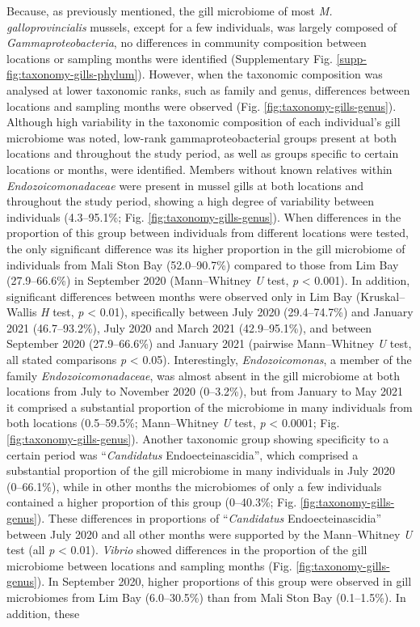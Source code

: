 \documentclass[
  12 pt,
]{article}
\begin{document}
Because, as previously mentioned, the gill microbiome of most \emph{M. galloprovincialis} mussels, except for a few individuals, was largely composed of \emph{Gammaproteobacteria}, no differences in community composition between locations or sampling months were identified (Supplementary Fig. \ref{supp-fig:taxonomy-gills-phylum}). However, when the taxonomic composition was analysed at lower taxonomic ranks, such as family and genus, differences between locations and sampling months were observed (Fig. \ref{fig:taxonomy-gills-genus}). Although high variability in the taxonomic composition of each individual's gill microbiome was noted, low-rank gammaproteobacterial groups present at both locations and throughout the study period, as well as groups specific to certain locations or months, were identified. Members without known relatives within \emph{Endozoicomonadaceae} were present in mussel gills at both locations and throughout the study period, showing a high degree of variability between individuals (4.3--95.1\unit{\percent}; Fig. \ref{fig:taxonomy-gills-genus}). When differences in the proportion of this group between individuals from different locations were tested, the only significant difference was its higher proportion in the gill microbiome of individuals from Mali Ston Bay (52.0--90.7\unit{\percent}) compared to those from Lim Bay (27.9--66.6\unit{\percent}) in September 2020 (Mann--Whitney \emph{U} test, \emph{p} \textless{} 0.001). In addition, significant differences between months were observed only in Lim Bay (Kruskal--Wallis \emph{H} test, \emph{p} \textless{} 0.01), specifically between July 2020 (29.4--74.7\unit{\percent}) and January 2021 (46.7--93.2\unit{\percent}), July 2020 and March 2021 (42.9--95.1\unit{\percent}), and between September 2020 (27.9--66.6\unit{\percent}) and January 2021 (pairwise Mann--Whitney \emph{U} test, all stated comparisons \emph{p} \textless{} 0.05). Interestingly, \emph{Endozoicomonas}, a member of the family \emph{Endozoicomonadaceae}, was almost absent in the gill microbiome at both locations from July to November 2020 (0--3.2\unit{\percent}), but from January to May 2021 it comprised a substantial proportion of the microbiome in many individuals from both locations (0.5--59.5\unit{\percent}; Mann--Whitney \emph{U} test, \emph{p} \textless{} 0.0001; Fig. \ref{fig:taxonomy-gills-genus}). Another taxonomic group showing specificity to a certain period was ``\emph{Candidatus} Endoecteinascidia'', which comprised a substantial proportion of the gill microbiome in many individuals in July 2020 (0--66.1\unit{\percent}), while in other months the microbiomes of only a few individuals contained a higher proportion of this group (0--40.3\unit{\percent}; Fig. \ref{fig:taxonomy-gills-genus}). These differences in proportions of ``\emph{Candidatus} Endoecteinascidia'' between July 2020 and all other months were supported by the Mann--Whitney \emph{U} test (all \emph{p} \textless{} 0.01). \emph{Vibrio} showed differences in the proportion of the gill microbiome between locations and sampling months (Fig. \ref{fig:taxonomy-gills-genus}). In September 2020, higher proportions of this group were observed in gill microbiomes from Lim Bay (6.0--30.5\unit{\percent}) than from Mali Ston Bay (0.1--1.5\unit{\percent}). In addition, these 
\end{document}
